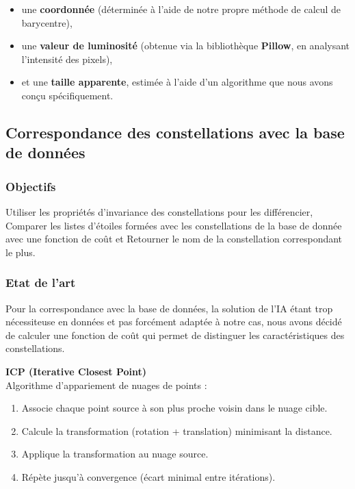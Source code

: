 \begin{itemize}
    \item une \textbf{coordonnée} (déterminée à l’aide de notre propre méthode de calcul de barycentre),
    \item une \textbf{valeur de luminosité} (obtenue via la bibliothèque \textbf{Pillow}, en analysant l’intensité des pixels),
    \item et une \textbf{taille apparente}, estimée à l’aide d’un algorithme que nous avons conçu spécifiquement.
\end{itemize}

\newpage

\subsection{Correspondance des constellations avec la base de données}

\subsubsection{Objectifs}

Utiliser les propriétés d'invariance des constellations pour les différencier, Comparer les listes d'étoiles formées avec les constellations de la base de donnée avec une fonction de coût et Retourner le nom de la constellation correspondant le plus.

\subsubsection{Etat de l'art}
Pour la correspondance avec la base de données, la solution de l'IA étant trop nécessiteuse en données et pas forcément adaptée à notre cas, nous avons décidé de calculer une fonction de coût qui permet de distinguer les caractéristiques des constellations.

\vspace{0.5cm}

\noindent \textbf{ICP (Iterative Closest Point)}\\
Algorithme d’appariement de nuages de points :
\begin{enumerate}[noitemsep]
    \item Associe chaque point source à son plus proche voisin dans le nuage cible.
    \item Calcule la transformation (rotation + translation) minimisant la distance.
    \item Applique la transformation au nuage source.
    \item Répète jusqu’à convergence (écart minimal entre itérations).
\end{enumerate}

